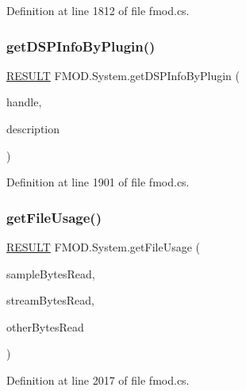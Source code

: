 Definition at line 1812 of file fmod.\+cs.

\mbox{\label{class_f_m_o_d_1_1_system_a5cbabf0ec3a3aa5ffa7b02909793b494}} 
\subsubsection{\texorpdfstring{get\+D\+S\+P\+Info\+By\+Plugin()}{getDSPInfoByPlugin()}}
{\footnotesize\ttfamily \hyperlink{namespace_f_m_o_d_a305d1176ef3f8c8815861a60407ac33d}{R\+E\+S\+U\+LT} F\+M\+O\+D.\+System.\+get\+D\+S\+P\+Info\+By\+Plugin (\begin{DoxyParamCaption}\item[{uint}]{handle,  }\item[{out Int\+Ptr}]{description }\end{DoxyParamCaption})}



Definition at line 1901 of file fmod.\+cs.

\mbox{\label{class_f_m_o_d_1_1_system_a1c3c5a860eadebf0edd6ae4960d9263f}} 
\subsubsection{\texorpdfstring{get\+File\+Usage()}{getFileUsage()}}
{\footnotesize\ttfamily \hyperlink{namespace_f_m_o_d_a305d1176ef3f8c8815861a60407ac33d}{R\+E\+S\+U\+LT} F\+M\+O\+D.\+System.\+get\+File\+Usage (\begin{DoxyParamCaption}\item[{out Int64}]{sample\+Bytes\+Read,  }\item[{out Int64}]{stream\+Bytes\+Read,  }\item[{out Int64}]{other\+Bytes\+Read }\end{DoxyParamCaption})}



Definition at line 2017 of file fmod.\+cs.

\mbox{\label{class_f_m_o_d_1_1_system_a49de01f4b3165fec74fef4f865dd16c5}} 
